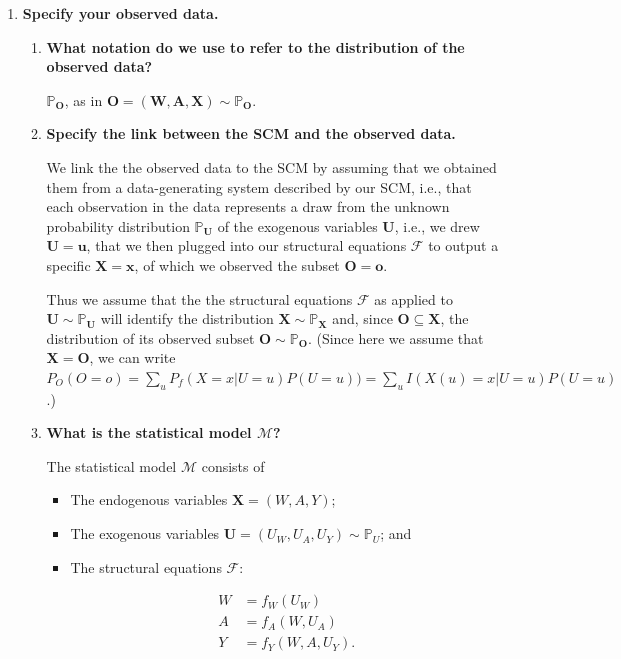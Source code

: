 \documentclass{article}\usepackage[]{graphicx}\usepackage[]{xcolor}
\begin{document}
\begin{enumerate}[label=\textbf{\arabic*.}]

  \item \textbf{Specify your observed data.}
  
  \begin{enumerate}[label=\textbf{(\alph*)}]
  
    \item \textbf{What notation do we use to refer to the distribution of the observed data?}
    
    $\mathbb{P}_{\bm{O}}$, as in $\bm{O} = (\bm{W}, \bm{A}, \bm{X}) \sim \mathbb{P}_{\bm{O}}.$
  
    \item \textbf{Specify the link between the SCM and the observed data.}
    
We link the the observed data to the SCM by assuming that we obtained them from a data-generating system described by our SCM, i.e., that each observation in the data represents a draw from the unknown probability distribution $\mathbb{P}_{\bm{U}}$ of the exogenous variables $\bm{U}$, i.e., we drew $\bm{U} = \bm{u}$, that we then plugged into our structural equations $\mathcal{F}$ to output a specific $\bm{X} = \bm{x}$, of which we observed the subset $\bm{O} = \bm{o}$.
    
Thus we assume that the the structural equations $\mathcal{F}$ as applied to $\bm{U} \sim \mathbb{P}_{\bm{U}}$ will identify the distribution $\bm{X} \sim \mathbb{P}_{\bm{X}}$ and, since $\bm{O} \subseteq \bm{X}$, the distribution of its observed subset $\bm{O} \sim \mathbb{P}_{\bm{O}}$. (Since here we assume that $\bm{X} = \bm{O}$, we can write $P_O(O = o) = \sum\limits_{u}P_f(X=x|U=u)P(U=u)) = \sum\limits_{u}I(X(u)=x|U=u)P(U=u)$.)
    
    \item \textbf{What is the statistical model $\mathcal{M}$?}
    
The statistical model $\mathcal{M}$ consists of 

\begin{itemize}

  \item The endogenous variables $\bm{X} = (W, A, Y)$;
  \item The exogenous variables $\bm{U} = (U_W, U_A, U_Y) \sim \mathbb{P}_U$; and
  \item The structural equations $\mathcal{F}$:

\begin{align*}
W &= f_W(U_W) \\
A &= f_A(W,U_A) \\
Y &= f_Y(W,A,U_Y).
\end{align*}


\end{itemize}
\end{enumerate}
\end{enumerate}
\end{document}
